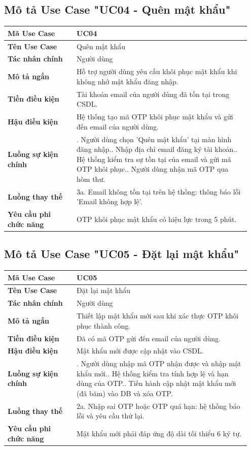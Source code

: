 \subsection{Mô tả Use Case "UC04 - Quên mật khẩu"}

\begin{longtable}[]{@{}>{\RaggedRight\arraybackslash}p{0.27\linewidth}>{\RaggedRight\arraybackslash}p{0.68\linewidth}@{}}
\toprule
\textbf{Mã Use Case} & UC04\tabularnewline
\midrule
\endhead
\textbf{Tên Use Case} & Quên mật khẩu\tabularnewline
\textbf{Tác nhân chính} & Người dùng\tabularnewline
\textbf{Mô tả ngắn} & Hỗ trợ người dùng yêu cầu khôi phục mật khẩu khi
không nhớ mật khẩu đăng nhập.\tabularnewline
\textbf{Tiền điều kiện} & Tài khoản email của người dùng đã tồn tại
trong CSDL.\tabularnewline
\textbf{Hậu điều kiện} & Hệ thống tạo mã OTP khôi phục mật khẩu và gửi
đến email của người dùng.\tabularnewline
\textbf{Luồng sự kiện chính} & 1. Người dùng chọn
'Quên mật khẩu' tại màn hình đăng nhập.\newline 2. Nhập địa chỉ
email đăng ký tài khoản.\newline 3. Hệ thống kiểm tra sự tồn tại
của email và gửi mã OTP khôi phục.\newline 4. Người dùng nhận mã
OTP qua hòm thư.\tabularnewline
\textbf{Luồng thay thế} & 3a. Email không tồn tại trên hệ thống: thông
báo lỗi 'Email không hợp lệ'.\tabularnewline
\textbf{Yêu cầu phi chức năng} & OTP khôi phục mật khẩu có hiệu lực
trong 5 phút.\tabularnewline
\bottomrule
\end{longtable}

\subsection{Mô tả Use Case "UC05 - Đặt lại mật khẩu"}

\begin{longtable}[]{@{}>{\RaggedRight\arraybackslash}p{0.27\linewidth}>{\RaggedRight\arraybackslash}p{0.68\linewidth}@{}}
\toprule
\textbf{Mã Use Case} & UC05\tabularnewline
\midrule
\endhead
\textbf{Tên Use Case} & Đặt lại mật khẩu\tabularnewline
\textbf{Tác nhân chính} & Người dùng\tabularnewline
\textbf{Mô tả ngắn} & Thiết lập mật khẩu mới sau khi xác thực OTP khôi
phục thành công.\tabularnewline
\textbf{Tiền điều kiện} & Đã có mã OTP gửi đến email của người
dùng.\tabularnewline
\textbf{Hậu điều kiện} & Mật khẩu mới được cập nhật vào
CSDL.\tabularnewline
\textbf{Luồng sự kiện chính} & 1. Người dùng nhập mã
OTP nhận được và nhập mật khẩu mới.\newline 2. Hệ thống kiểm tra
tính hợp lệ và hạn dùng của OTP.\newline 3. Tiến hành cập nhật mật
khẩu mới (đã băm) vào DB và xóa OTP.\tabularnewline
\textbf{Luồng thay thế} & 2a. Nhập sai OTP hoặc OTP quá hạn: hệ thống
báo lỗi và yêu cầu thử lại.\tabularnewline
\textbf{Yêu cầu phi chức năng} & Mật khẩu mới phải đáp ứng độ dài tối
thiểu 6 ký tự.\tabularnewline
\bottomrule
\end{longtable}

